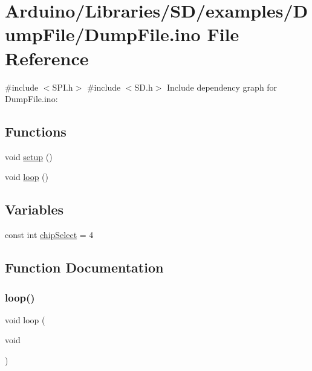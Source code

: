 \hypertarget{_dump_file_8ino}{}\section{Arduino/\+Libraries/\+S\+D/examples/\+Dump\+File/\+Dump\+File.ino File Reference}
\label{_dump_file_8ino}
{\ttfamily \#include $<$S\+P\+I.\+h$>$}\newline
{\ttfamily \#include $<$S\+D.\+h$>$}\newline
Include dependency graph for Dump\+File.\+ino\+:
\subsection*{Functions}
\begin{DoxyCompactItemize}
\item 
void \hyperlink{_dump_file_8ino_a4fc01d736fe50cf5b977f755b675f11d}{setup} ()
\item 
void \hyperlink{_dump_file_8ino_afe461d27b9c48d5921c00d521181f12f}{loop} ()
\end{DoxyCompactItemize}
\subsection*{Variables}
\begin{DoxyCompactItemize}
\item 
const int \hyperlink{_dump_file_8ino_a266db0f4dbdfbc06ea34c96f66bebed3}{chip\+Select} = 4
\end{DoxyCompactItemize}


\subsection{Function Documentation}
\mbox{\label{_dump_file_8ino_afe461d27b9c48d5921c00d521181f12f}} 
\subsubsection{\texorpdfstring{loop()}{loop()}}
{\footnotesize\ttfamily void loop (\begin{DoxyParamCaption}\item[{void}]{ }\end{DoxyParamCaption})}

